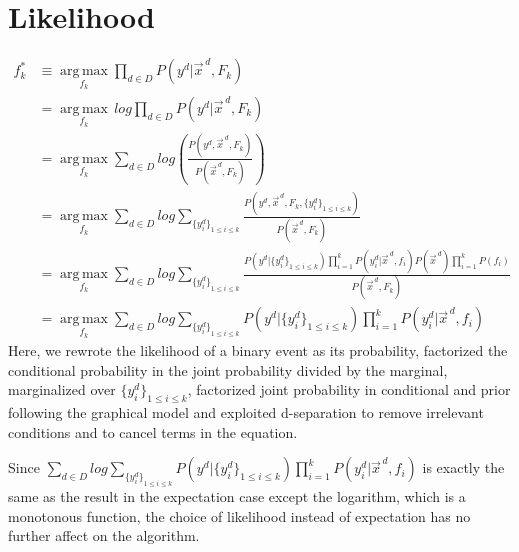 \documentclass[11pt,a4paper]{article}
\begin{document}
\section{Likelihood}
\begin{align}
f_k^*&\equiv\operatorname*{arg\,max}_{f_k}\prod_{d\in D}P\left(y^d|\vec{x}^{\,d},F_k\right)\nonumber\\
&=\operatorname*{arg\,max}_{f_k}\,log\prod_{d\in D}P\left(y^d|\vec{x}^{\,d},F_k\right)\nonumber\\
&=\operatorname*{arg\,max}_{f_k}\sum_{d\in D}log\left(\frac{P\left(y^d,\vec{x}^{\,d},F_k\right)}{P\left(\vec{x}^{\,d},F_k\right)}\right)\nonumber\\
&=\operatorname*{arg\,max}_{f_k}\sum_{d\in D}log\sum_{\{y_i^d\}_{1\leq i\leq k}}\frac{P\left(y^d,\vec{x}^{\,d}, F_k,\{y_i^d\}_{1\leq i\leq k}\right)}{P\left(\vec{x}^{\,d},F_k\right)}\nonumber\\
&=\operatorname*{arg\,max}_{f_k} \sum_{d \in D} log\sum_{{\{y_i^d\}}_{1\leq i \leq k}} \frac{P\left(y^d| \{y^d_i\}_{1 \leq i \leq k}\right) \prod_{i=1}^kP\left(y_i^d|\vec{x}^{\,d},f_i\right)P\left(\vec{x}^{\,d}\right)\prod_{i=1}^kP\left(f_i\right)}{P\left(\vec{x}^{\,d}, F_k\right)}\nonumber\\
&=\operatorname*{arg\,max}_{f_k}\sum_{d\in D}log\sum_{{\{y_i^d\}}_{1\leq i\leq k}}P\left(y^d|\{y^d_i\}_{1\leq i\leq k}\right)\prod_{i=1}^kP\left(y_i^d|\vec{x}^{\,d},f_i\right)\nonumber
\end{align}
Here, we rewrote the likelihood of a binary event as its probability, factorized the conditional probability in the joint probability divided by the marginal, marginalized over $\{y^d_i\}_{1\leq i\leq k}$, factorized joint probability in conditional and prior following the graphical model and exploited d-separation to remove irrelevant conditions and to cancel terms in the equation.

Since $\sum_{d\in D}log\sum_{{\{y_i^d\}}_{1\leq i\leq k}}P\left(y^d|\{y^d_i\}_{1\leq i\leq k}\right)\prod_{i=1}^kP\left(y_i^d|\vec{x}^{\,d},f_i\right)$ is exactly the same as the result in the expectation case except the logarithm, which is a monotonous function, the choice of likelihood instead of expectation has no further affect on the algorithm.
\end{document}
